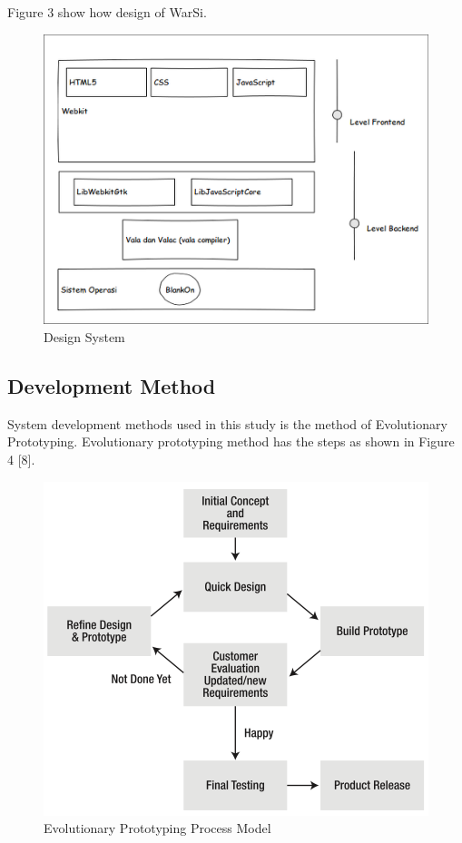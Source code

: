 \documentclass[conference, letterpaper]{IEEEtran}
\begin{document}
Figure 3 show how design of WarSi.

\begin{figure}[!t]
\centering
\includegraphics[scale=0.5]{image/DesignSystem.png}
\caption{Design System}
\end{figure}

\subsection{Development Method}
System development methods used in this study is the method of Evolutionary Prototyping. Evolutionary prototyping method has the steps as shown in Figure 4 [8].

\begin{figure}[hbtp]
\centering
\includegraphics[scale=0.5]{image/ep-model.png}
\caption{Evolutionary Prototyping Process Model}
\end{figure}
\end{document}
